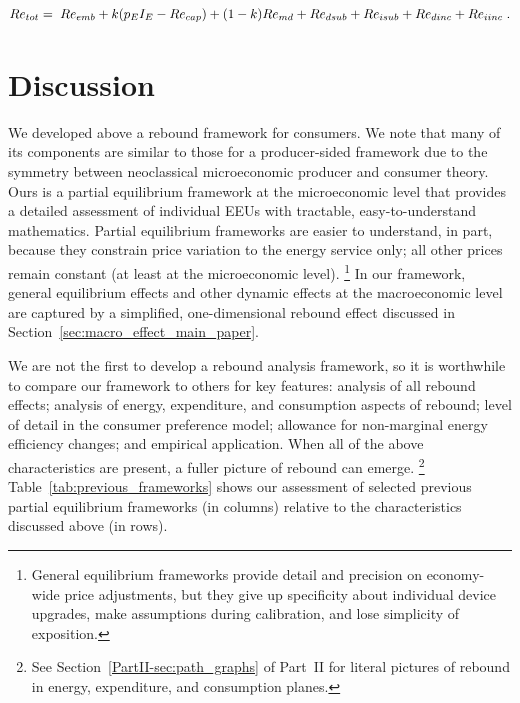 \documentclass[12pt]{article}\usepackage[]{graphicx}\usepackage[]{xcolor}
\begin{document}
\begin{align} \label{eq:Re_tot}  
  Re_{tot} = \; Re_{emb} + k (p_E I_E - Re_{cap}) + (1-k) Re_{md} + Re_{dsub} + Re_{isub} + Re_{dinc} + Re_{iinc}{} \; .
\end{align}


\section{Discussion}
\label{sec:discussion}

We developed above a rebound framework for consumers. 
We note that many of its components are similar
to those for a producer-sided framework
due to the symmetry between
neoclassical microeconomic producer and consumer theory.
Ours is a partial equilibrium framework at the microeconomic level
that provides a detailed assessment of individual EEUs with tractable,
easy-to-understand mathematics.
Partial equilibrium frameworks are easier to understand, in part, because
they constrain price variation to the energy service only; 
all other prices remain constant
(at least at the microeconomic level).%
\footnote{
  General equilibrium frameworks provide detail and precision
  on economy-wide price adjustments, but
  they give up specificity about individual device upgrades, 
  make assumptions during calibration, and 
  lose simplicity of exposition.
}
%
In our framework, 
general equilibrium effects and other dynamic effects 
at the macroeconomic level are captured by 
a simplified, one-dimensional rebound effect
discussed in Section~\ref{sec:macro_effect_main_paper}.

We are not the first to develop a rebound analysis framework,
so it is worthwhile to compare our framework to others
for key features: 
analysis of all rebound effects; 
analysis of energy, expenditure, and consumption aspects of rebound; 
level of detail in the consumer preference model;
allowance for non-marginal energy efficiency changes; and 
empirical application.
When all of the above characteristics are present, 
a fuller picture of rebound can emerge.%
\footnote{
  See Section~\ref{PartII-sec:path_graphs} of Part~II for literal pictures of rebound in 
  energy, expenditure, and consumption planes.
}
%
Table~\ref{tab:previous_frameworks} shows our assessment
of selected previous partial equilibrium frameworks (in columns)
relative to the characteristics discussed above (in rows).

\renewcommand{\arraystretch}{0.6}
\end{document}
